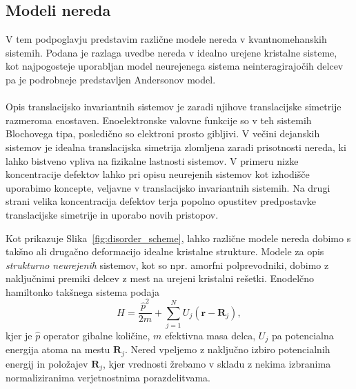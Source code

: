 \subsection{Modeli nereda}
V tem podpoglavju predstavim različne modele nereda v kvantnomehanskih sistemih. Podana je razlaga uvedbe nereda v idealno urejene kristalne sisteme, kot najpogosteje uporabljan model neurejenega sistema neinteragirajočih delcev pa je podrobneje predstavljen Andersonov model. \\\\
Opis translacijsko invariantnih sistemov je zaradi njihove translacijske simetrije razmeroma enostaven. Enoelektronske valovne funkcije so v teh sistemih Blochovega tipa, posledično so elektroni prosto gibljivi. V večini dejanskih sistemov je idealna translacijska simetrija zlomljena zaradi prisotnosti nereda, ki lahko bistveno vpliva na fizikalne lastnosti sistemov. V primeru nizke koncentracije defektov lahko pri opisu neurejenih sistemov kot izhodišče uporabimo koncepte, veljavne v translacijsko invariantnih sistemih. Na drugi strani velika koncentracija defektov terja popolno opustitev predpostavke translacijske simetrije in uporabo novih pristopov. \\
\begin{minipage}[t]{0.54\textwidth}
Kot prikazuje Slika~\ref{fig:disorder_scheme}, lahko različne modele nereda dobimo s takšno ali drugačno deformacijo idealne kristalne strukture. Modele za opis \emph{strukturno neurejenih} sistemov, kot so npr. amorfni polprevodniki,  dobimo z naključnimi premiki delcev z mest na urejeni kristalni rešetki. Enodelčno hamiltonko takšnega sistema podaja 
\begin{equation}\label{eq:cont_ham}
H=\frac{\hat{p}^2}{2m} + \sum\limits_{j=1}^N U_j(\textbf{r}- \textbf{R}_j), 
\end{equation}
kjer je $\hat{p}$ operator gibalne količine, $m$ efektivna masa delca, $U_j$ pa potencialna energija atoma na mestu $\textbf{R}_j$. Nered vpeljemo z naključno izbiro potencialnih energij in položajev $\textbf{R}_j$, kjer vrednosti žrebamo v skladu z nekima izbranima normaliziranima verjetnostnima porazdelitvama. \\\\
\end{minipage}\hfill
